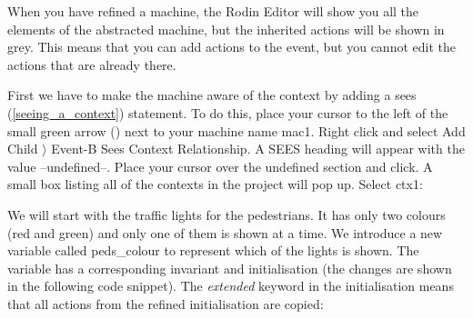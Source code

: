 When you have refined a machine, the Rodin Editor will show you all the elements of the abstracted machine, but the inherited actions will be shown in grey. This means that you can add actions to the event, but you cannot edit the actions that are already there.





First we have to make the machine aware of the context by adding a \textsf{sees} (\ref{seeing_a_context}) statement. To do this, place your cursor to the left of the small green arrow () next to your machine name \textsf{mac1}. Right click and select \textsf{Add Child $\rangle$ Event-B Sees Context Relationship}. A \textsf{SEES} heading will appear with the value \textsf{--undefined--}. Place your cursor over the undefined section and click. A small box listing all of the contexts in the project will pop up. Select \textsf{ctx1}:


We will start with the traffic lights for the pedestrians. It has only two colours (red and green) and only one of them is shown at a time.  We introduce a new variable called \textsf{peds\_colour} to represent which of the lights is shown. The variable has a corresponding invariant and initialisation (the changes are shown in the following code snippet). The \textit{extended}	keyword in the initialisation means that all
actions from the refined initialisation are copied:


